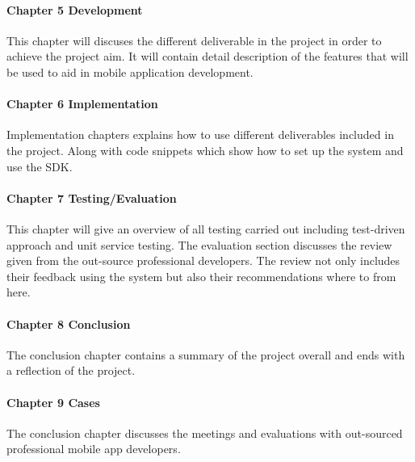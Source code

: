 \paragraph{Chapter 5 Development}

This chapter will discuses the different deliverable in the project in order to achieve the project aim. It will contain detail description of the features that will be used to aid in mobile application development.

\paragraph{Chapter 6 Implementation}

Implementation chapters explains how to use different deliverables included in the project. Along with code snippets which show how to set up the system and use the SDK.

\paragraph{Chapter 7 Testing/Evaluation}

This chapter will give an overview of all testing carried out including test-driven approach and unit service testing. The evaluation section discusses the review given from the out-source professional developers. The review not only includes their feedback using the system but also their recommendations where to from here. 

\paragraph{Chapter 8 Conclusion}
The conclusion chapter contains a summary of the project overall and ends with a reflection of the project.

\paragraph{Chapter 9 Cases}
The conclusion chapter discusses the meetings and evaluations with out-sourced professional mobile app developers.